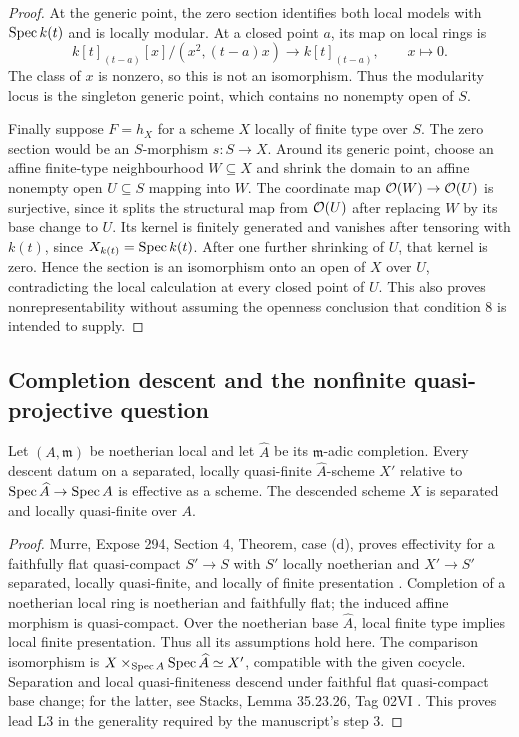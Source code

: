 \begin{proof}
At the generic point, the zero section identifies both local models with
$\operatorname{Spec} k(t)$ and is locally modular. At a closed point $a$, its map on
local rings is
\[
 k[t]_{(t-a)}[x]/(x^2,(t-a)x)\longrightarrow k[t]_{(t-a)},\qquad x\mapsto0.
\]
The class of $x$ is nonzero, so this is not an isomorphism. Thus the
modularity locus is the singleton generic point, which contains no
nonempty open of $S$.

Finally suppose $F=h_X$ for a scheme $X$ locally of finite type over $S$.
The zero section would be an $S$-morphism $s:S\to X$. Around its generic
point, choose an affine finite-type neighbourhood $W\subseteq X$ and
shrink the domain to an affine nonempty open $U\subseteq S$ mapping
into $W$. The coordinate map $\mathcal O(W)\to\mathcal O(U)$ is surjective, since it
splits the structural map from $\mathcal O(U)$ after replacing $W$ by its
base change to $U$. Its kernel is finitely generated and vanishes after
tensoring with $k(t)$, since $X_{k(t)}=\operatorname{Spec} k(t)$. After one further
shrinking of $U$, that kernel is zero. Hence the section is an
isomorphism onto an open of $X$ over $U$, contradicting the local
calculation at every closed point of $U$. This also proves
nonrepresentability without assuming the openness conclusion that
condition 8 is intended to supply.
\end{proof}

\subsection{Completion descent and the nonfinite quasi-projective question}

\begin{theorem}\label{A:completion-descent}
Let $(A,\mathfrak m)$ be noetherian local and let $\widehat A$ be its
$\mathfrak m$-adic completion. Every descent datum on a separated,
locally quasi-finite $\widehat A$-scheme $X'$ relative to
$\operatorname{Spec}\widehat A\to\operatorname{Spec} A$ is effective as a scheme. The descended
scheme $X$ is separated and locally quasi-finite over $A$.
\end{theorem}
\begin{proof}
Murre, Expose 294, Section 4, Theorem, case (d), proves effectivity for a
faithfully flat quasi-compact $S'\to S$ with $S'$ locally noetherian and
$X'\to S'$ separated, locally quasi-finite, and locally of finite
presentation \cite{Murre1965}. Completion of a noetherian local ring is
noetherian and faithfully flat; the induced affine morphism is
quasi-compact. Over the noetherian base $\widehat A$, local finite type
implies local finite presentation. Thus all its assumptions hold here.
The comparison isomorphism is
$X\times_{\operatorname{Spec} A}\operatorname{Spec}\widehat A\simeq X'$, compatible with the given
cocycle. Separation and local quasi-finiteness descend under faithful
flat quasi-compact base change; for the latter, see
Stacks, Lemma 35.23.26, Tag 02VI \cite{Stacks02VI}.
This proves lead L3 in the generality required by the manuscript's step 3.
\end{proof}


